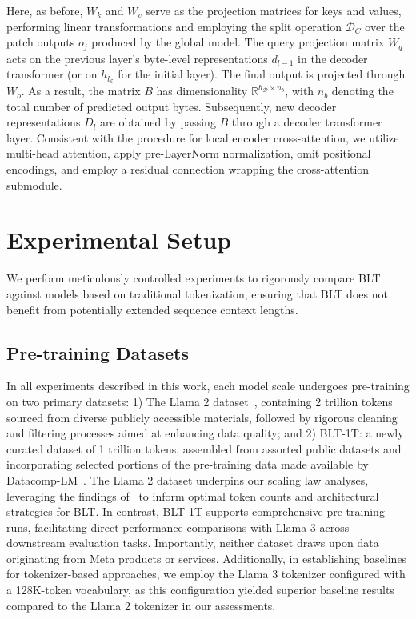 Here, as before, $W_k$ and $W_v$ serve as the projection matrices for keys and values, performing linear transformations and employing the split operation $\mathcal{D}_C$ over the patch outputs $o_j$ produced by the global model. The query projection matrix $W_q$ acts on the previous layer’s byte-level representations $d_{l-1}$ in the decoder transformer (or on $h_{l_{\mathcal{E}}}$ for the initial layer). The final output is projected through $W_o$. As a result, the matrix $B$ has dimensionality $\mathbb{R}^{h_{\mathcal{D}} \times n_b}$, with $n_b$ denoting the total number of predicted output bytes. Subsequently, new decoder representations $D_l$ are obtained by passing $B$ through a decoder transformer layer. Consistent with the procedure for local encoder cross-attention, we utilize multi-head attention, apply pre-LayerNorm normalization, omit positional encodings, and employ a residual connection wrapping the cross-attention submodule.

\section{Experimental Setup}
\label{section:experiments}
We perform meticulously controlled experiments to rigorously compare {\textsc BLT} against models based on traditional tokenization, ensuring that {\textsc BLT} does not benefit from potentially extended sequence context lengths.

\subsection{Pre-training Datasets} In all experiments described in this work, each model scale undergoes pre-training on two primary datasets: 1) The Llama 2 dataset~\citep{touvron2023llama}, containing 2 trillion tokens sourced from diverse publicly accessible materials, followed by rigorous cleaning and filtering processes aimed at enhancing data quality; and 2) {\textsc BLT}-1T: a newly curated dataset of 1 trillion tokens, assembled from assorted public datasets and incorporating selected portions of the pre-training data made available by Datacomp-LM~\citep{li2024datacomp}. The Llama 2 dataset underpins our scaling law analyses, leveraging the findings of~\cite{dubey2024llama} to inform optimal token counts and architectural strategies for {\textsc BLT}. In contrast, {\textsc BLT}-1T supports comprehensive pre-training runs, facilitating direct performance comparisons with Llama 3 across downstream evaluation tasks. Importantly, neither dataset draws upon data originating from Meta products or services. Additionally, in establishing baselines for tokenizer-based approaches, we employ the Llama 3 tokenizer configured with a 128K-token vocabulary, as this configuration yielded superior baseline results compared to the Llama 2 tokenizer in our assessments.

